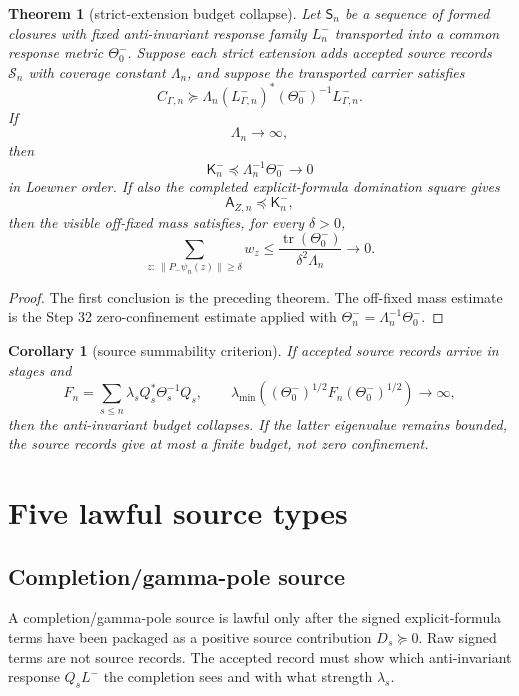 \documentclass[11pt]{article}
\newtheorem{theorem}{Theorem}
\newtheorem{corollary}{Corollary}
\begin{document}
\begin{theorem}[strict-extension budget collapse]
Let \(\mathsf S_n\) be a sequence of formed closures with fixed anti-invariant response family \(L^-_n\) transported into a common response metric \(\Theta_0^-\).  Suppose each strict extension adds accepted source records \(\mathcal S_n\) with coverage constant \(\Lambda_n\), and suppose the transported carrier satisfies
\[
  C_{\Gamma,n}\succeq \Lambda_n (L^-_{\Gamma,n})^*(\Theta_0^-)^{-1}L^-_{\Gamma,n}.
\]
If
\[
  \Lambda_n\to\infty,
\]
then
\[
  \mathsf K^-_n\preceq \Lambda_n^{-1}\Theta_0^-\to0
\]
in Loewner order.  If also the completed explicit-formula domination square gives
\[
  \mathsf A_{Z,n}\preceq \mathsf K^-_n,
\]
then the visible off-fixed mass satisfies, for every \(\delta>0\),
\[
  \sum_{z:\ \|P_-\psi_n(z)\|\ge \delta}w_z
  \le
  \frac{\operatorname{tr}(\Theta_0^-)}{\delta^2\Lambda_n}\to0.
\]
\end{theorem}

\begin{proof}
The first conclusion is the preceding theorem.  The off-fixed mass estimate is the Step 32 zero-confinement estimate applied with \(\Theta_n^- = \Lambda_n^{-1}\Theta_0^-\).
\end{proof}

\begin{corollary}[source summability criterion]
If accepted source records arrive in stages and
\[
  F_n=\sum_{s\le n}\lambda_s Q_s^*\Theta_s^{-1}Q_s,
  \qquad
  \lambda_{\min}((\Theta_0^-)^{1/2}F_n(\Theta_0^-)^{1/2})\to\infty,
\]
then the anti-invariant budget collapses.  If the latter eigenvalue remains bounded, the source records give at most a finite budget, not zero confinement.
\end{corollary}

\section{Five lawful source types}

\subsection{Completion/gamma-pole source}
A completion/gamma-pole source is lawful only after the signed explicit-formula terms have been packaged as a positive source contribution \(D_s\succeq0\).  Raw signed terms are not source records.  The accepted record must show which anti-invariant response \(Q_sL^-\) the completion sees and with what strength \(\lambda_s\).
\end{document}
